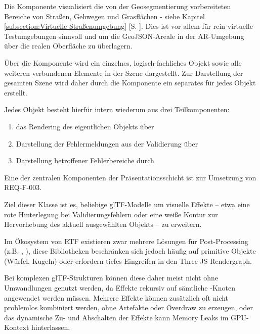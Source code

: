 \medskip

Die Komponente  visualisiert die von der Geosegmentierung vorbereiteten Bereiche von Straßen, Gehwegen und Grasflächen - siehe Kapitel \ref{subsection:Virtuelle Straßenumgebung} [S. \pageref{subsection:Virtuelle Straßenumgebung}]. Dies ist vor allem für rein virtuelle Testumgebungen sinnvoll und um die GeoJSON-Areale in der AR-Umgebung über die realen Oberfläche zu überlagern.

\medskip

Über die Komponente  wird ein einzelnes, logisch-fachliches Objekt sowie alle weiteren verbundenen Elemente in der Szene dargestellt. Zur Darstellung der gesamten Szene wird daher durch die  Komponente ein separates  für jedes Objekt erstellt.

Jedes Objekt besteht hierfür intern wiederum aus drei Teilkomponenten:

\begin{enumerate}
  \item das Rendering des eigentlichen Objekts über   
  \item Darstellung der Fehlermeldungen aus der Validierung über 
  \item Darstellung betroffener Fehlerbereiche durch 
\end{enumerate}

\medskip

Eine der zentralen Komponenten der Präsentationsschicht ist  zur Umsetzung von REQ-F-003.

Ziel dieser Klasse ist es, beliebige glTF-Modelle um visuelle Effekte – etwa eine rote Hinterlegung bei Validierungsfehlern oder eine weiße Kontur zur Hervorhebung des aktuell ausgewählten Objekts – zu erweitern.

Im Ökosystem von RTF existieren zwar mehrere Lösungen für Post-Processing  
(z.B. , ), diese Bibliotheken beschränken sich jedoch häufig auf primitive Objekte (Würfel, Kugeln) oder erfordern tiefes Eingreifen in den Three-JS-Rendergraph.

Bei komplexen glTF-Strukturen können diese daher meist nicht ohne Umwandlungen genutzt werden, da Effekte rekursiv auf sämtliche -Knoten angewendet werden müssen. Mehrere Effekte können zusätzlich oft nicht problemlos kombiniert werden, ohne Artefakte oder Overdraw zu erzeugen, oder das dynamische Zu- und Abschalten der Effekte kann Memory Leaks im GPU-Kontext hinterlassen.

